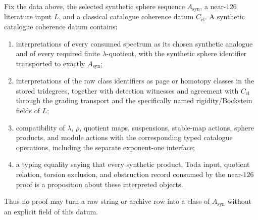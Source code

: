 \begin{definition}
  \label{def:synthetic-catalogue-coherence}
  \notready
  Fix the data above, the selected synthetic sphere sequence
  $A_{\mathrm{syn}}$, a near-$126$ literature input $L$, and a classical
  catalogue coherence datum $C_{\mathrm{cl}}$.  A synthetic catalogue
  coherence datum contains:
  \begin{enumerate}
    \item interpretations of every consumed spectrum as its chosen synthetic
      analogue and of every required finite $\lambda$-quotient, with the
      synthetic sphere identifier transported to exactly $A_{\mathrm{syn}}$;
    \item interpretations of the raw class identifiers as page or homotopy
      classes in the stored tridegrees, together with detection witnesses and
      agreement with $C_{\mathrm{cl}}$ through the grading transport and the
      specifically named rigidity/Bockstein fields of $L$;
    \item compatibility of $\lambda$, $\rho$, quotient maps, suspensions,
      stable-map actions, sphere products, and module actions with the
      corresponding typed catalogue operations, including the separate
      exponent-one interface;
    \item a typing equality saying that every synthetic product, Toda input,
      quotient relation, torsion exclusion, and obstruction record consumed by
      the near-$126$ proof is a proposition about these interpreted objects.
  \end{enumerate}
  Thus no proof may turn a raw string or archive row into a class of
  $A_{\mathrm{syn}}$ without an explicit field of this datum.
\end{definition}

